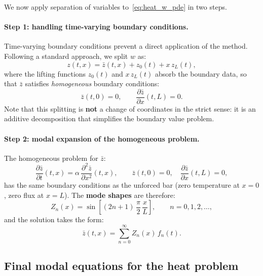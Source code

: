 We now apply separation of variables to~\eqref{eq:heat_w_pde} in two steps.

\paragraph{Step 1: handling time-varying boundary conditions.}

Time-varying boundary conditions prevent a direct application of the method.
Following a standard approach, we split $w$ as:
\begin{equation}
  z(t,x) = \bar{z}(t,x) + z_{0}(t) + x\,z_{L}(t),
  \label{eq:heat_split}
\end{equation}
where the lifting functions $z_{0}(t)$ and $x\,z_{L}(t)$ absorb the boundary
data, so that $\bar{z}$ satisfies \emph{homogeneous} boundary conditions:
\begin{equation}
  \bar{z}(t,0) = 0,
  \qquad
  \frac{\partial\bar{z}}{\partial x}(t,L) = 0.
\end{equation}
Note that this splitting is \textbf{not} a change of coordinates in the strict
sense: it is an additive decomposition that simplifies the boundary value
problem.

\paragraph{Step 2: modal expansion of the homogeneous problem.}

The homogeneous problem for $\bar{z}$:
\begin{equation}
  \frac{\partial\bar{z}}{\partial t}(t,x)
  = \alpha\,\frac{\partial^{2}\bar{z}}{\partial x^{2}}(t,x),
  \qquad
  \bar{z}(t,0) = 0,\quad
  \frac{\partial\bar{z}}{\partial x}(t,L) = 0,
  \label{eq:heat_homog}
\end{equation}
has the same boundary conditions as the unforced bar (zero temperature at
$x=0$, zero flux at $x=L$).  The \textbf{mode shapes} are therefore:
\begin{equation}
  Z_{n}(x) = \sin\!\left[(2n+1)\,\frac{\pi}{2}\,\frac{x}{L}\right],
  \qquad n = 0, 1, 2, \ldots,
  \label{eq:heat_modes}
\end{equation}
and the solution takes the form:
\begin{equation}
  \bar{z}(t,x) = \sum_{n=0}^{\infty} Z_{n}(x)\,f_{n}(t).
  \label{eq:heat_expansion}
\end{equation}


\subsection{Final modal equations for the heat problem}
\label{ssec:heat_modal_eqs}

